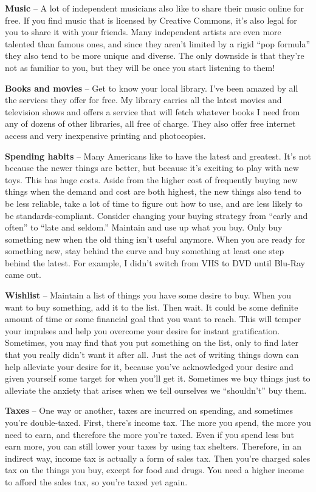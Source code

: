 \textbf{Music} -- A lot of independent musicians also like to share their music online for free. If you find music that is licensed by Creative Commons, it's also legal for you to share it with your friends. Many independent artists are even more talented than famous ones, and since they aren't limited by a rigid ``pop formula'' they also tend to be more unique and diverse. The only downside is that they're not as familiar to you, but they will be once you start listening to them!

\textbf{Books and movies} -- Get to know your local library. I've been amazed by all the services they offer for free. My library carries all the latest movies and television shows and offers a service that will fetch whatever books I need from any of dozens of other libraries, all free of charge. They also offer free internet access and very inexpensive printing and photocopies.

\textbf{Spending habits} -- Many Americans like to have the latest and greatest. It's not because the newer things are better, but because it's exciting to play with new toys. This has huge costs. Aside from the higher cost of frequently buying new things when the demand and cost are both highest, the new things also tend to be less reliable, take a lot of time to figure out how to use, and are less likely to be standards-compliant. Consider changing your buying strategy from ``early and often'' to ``late and seldom.'' Maintain and use up what you buy. Only buy something new when the old thing isn't useful anymore. When you are ready for something new, stay behind the curve and buy something at least one step behind the latest. For example, I didn't switch from VHS to DVD until Blu-Ray came out.

\textbf{Wishlist} -- Maintain a list of things you have some desire to buy. When you want to buy something, add it to the list. Then wait. It could be some definite amount of time or some financial goal that you want to reach. This will temper your impulses and help you overcome your desire for instant gratification. Sometimes, you may find that you put something on the list, only to find later that you really didn't want it after all. Just the act of writing things down can help alleviate your desire for it, because you've acknowledged your desire and given yourself some target for when you'll get it. Sometimes we buy things just to alleviate the anxiety that arises when we tell ourselves we ``shouldn't'' buy them.

\textbf{Taxes} -- One way or another, taxes are incurred on spending, and sometimes you're double-taxed. First, there's income tax. The more you spend, the more you need to earn, and therefore the more you're taxed. Even if you spend less but earn more, you can still lower your taxes by using tax shelters. Therefore, in an indirect way, income tax is actually a form of sales tax. Then you're charged sales tax on the things you buy, except for food and drugs. You need a higher income to afford the sales tax, so you're taxed yet again.

